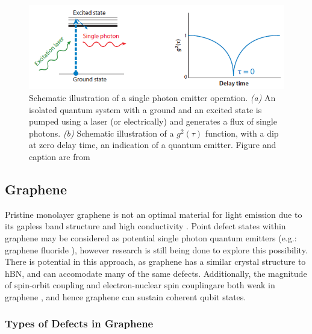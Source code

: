 \documentclass[]{article}
\begin{document}
\begin{figure}[htb]
	\centering
	\includegraphics{quantum_emitter_SPS.PNG}
	\caption{Schematic illustration of a single photon emitter operation. \textit{(a)} An isolated quantum system with a ground and an excited state is pumped using a laser (or electrically) and generates a flux of single photons.	\textit{(b)} Schematic illustration of a $g^2(\tau)$ function, with a dip at zero delay time, an indication of a quantum emitter. Figure and caption are from \cite{SP_sources_atomically_thin_materials_review}}
	\label{fig: quantum_emitter_SPS}
\end{figure}

\subsection{Graphene}
Pristine monolayer graphene is not an optimal material for light emission due to its gapless band structure and high conductivity \cite{2D_material_nanophotonics_HBN_BANDGAP, The_Electronic_Properties_of_Graphene}. Point defect states within graphene may be considered as potential single photon quantum emitters (e.g.: graphene fluoride \cite{point_defects_graphene_fluoride}), however research is still being done to explore this possibility. There is potential in this approach, as graphene has a similar crystal structure to hBN, and can accomodate many of the same defects. Additionally, the magnitude of spin-orbit coupling and electron-nuclear spin coupling\footnotemark are both weak in graphene \cite{spinning_edge_graphene, spin_qubits_GQD}, and hence graphene can sustain coherent qubit states. 


\subsubsection{Types of Defects in Graphene}
\end{document}
